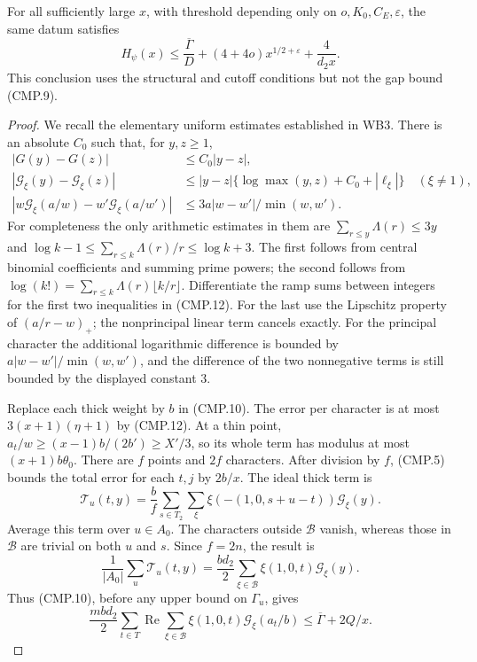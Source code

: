 \begin{lemma}
\label{claim:CMP2}
For all sufficiently large $x$, with threshold depending only on
$o,K_0,C_E,\varepsilon$, the same datum satisfies
\[
 H_\psi(x)\le\frac{\overline\Gamma}{D}
        +(4+4o)x^{1/2+\varepsilon}+\frac4{d_2x}.
 \tag{CMP.11}
\]
This conclusion uses the structural and cutoff conditions but not
the gap bound (CMP.9).
\end{lemma}
\begin{proof}
We recall the elementary uniform estimates established in WB3.
There is an absolute $C_0$ such that, for $y,z\ge1$,
\begin{align*}
 |G(y)-G(z)|&\le C_0|y-z|,\\
 |\mathcal G_\xi(y)-\mathcal G_\xi(z)|
 &\le |y-z|\{\log\max(y,z)+C_0+|\ell_\xi|\}\quad(\xi\ne1),\\
 |w\mathcal G_\xi(a/w)-w'\mathcal G_\xi(a/w')|
 &\le3a|w-w'|/\min(w,w').
                                                               \tag{CMP.12}
\end{align*}
For completeness the only arithmetic estimates in them are
$\sum_{r\le y}\Lambda(r)\le3y$ and
$\log k-1\le\sum_{r\le k}\Lambda(r)/r\le\log k+3$.
The first follows from central binomial coefficients and summing
prime powers; the second follows from
$\log(k!)=\sum_{r\le k}\Lambda(r)\lfloor k/r\rfloor$.
Differentiate the ramp sums between integers for the first two
inequalities in (CMP.12).  For the last use the Lipschitz property
of $(a/r-w)_+$; the nonprincipal linear term cancels exactly.
For the principal character the additional logarithmic difference
is bounded by $a|w-w'|/\min(w,w')$, and the difference of the two
nonnegative terms is still bounded by the displayed constant $3$.

Replace each thick weight by $b$ in (CMP.10).  The error per
character is at most $3(x+1)(\eta+1)$ by (CMP.12).
At a thin point,
$a_t/w\ge(x-1)b/(2b')\ge X'/3$, so its whole term has modulus
at most $(x+1)b\theta_0$.  There are $f$ points and $2f$
characters.  After division by $f$, (CMP.5) bounds the total error
for each $t,j$ by $2b/x$.
The ideal thick term is
\[
 \mathcal T_u(t,y)=\frac b f\sum_{s\in T_2}\sum_\xi
             \xi(-(1,0,s+u-t))\mathcal G_\xi(y).
\]
Average this term over $u\in A_0$.  The characters outside
$\mathcal B$ vanish, whereas those in $\mathcal B$ are trivial
on both $u$ and $s$.  Since $f=2n$, the result is
\[
 \frac1{|A_0|}\sum_u\mathcal T_u(t,y)
       =\frac{bd_2}{2}\sum_{\xi\in\mathcal B}
                                   \xi(1,0,t)\mathcal G_\xi(y).
\]
Thus (CMP.10), before any upper bound on $\Gamma_u$, gives
\[
 \frac{mbd_2}{2}\sum_{t\in T}
       \operatorname{Re}\sum_{\xi\in\mathcal B}
               \xi(1,0,t)\mathcal G_\xi(a_t/b)
                  \le\overline\Gamma+2Q/x.          \tag{CMP.13}
\]


\end{proof}
